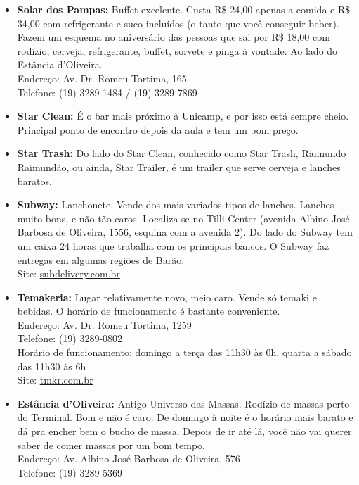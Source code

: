 \begin{itemize}
\item   \textbf{Solar dos Pampas:} Buffet excelente. Custa R\$ 24,00 apenas a
        comida e R\$ 34,00 com refrigerante e suco incluídos (o tanto que você
        conseguir beber). Fazem um esquema no aniversário das pessoas que sai
        por R\$ 18,00 com rodízio, cerveja, refrigerante, buffet, sorvete e
        pinga à vontade. Ao lado do Estância d'Oliveira.
        \\Endereço: Av. Dr. Romeu Tortima, 165
        \\Telefone: (19) 3289-1484 / (19) 3289-7869

\item   \textbf{Star Clean:} É o bar mais próximo à Unicamp, e por isso está
        sempre cheio. Principal ponto de encontro depois da aula e tem um bom
        preço.

\item   \textbf{Star Trash:} Do lado do Star Clean, conhecido como Star Trash,
        Raimundo Raimundão, ou ainda, Star Trailer, é um trailer que serve
        cerveja e lanches baratos.

\item   \textbf{Subway:} Lanchonete. Vende dos mais variados tipos de lanches.
        Lanches muito bons, e não tão caros. Localiza-se no Tilli Center
        (avenida Albino José Barbosa de Oliveira, 1556, esquina com a avenida
        2). Do lado do Subway tem um caixa 24 horas que trabalha com os
        principais bancos. O Subway faz entregas em algumas regiões de Barão.
        \\Site: \url{subdelivery.com.br}

\item   \textbf{Temakeria:} Lugar relativamente novo, meio caro. Vende só temaki
        e bebidas. O horário de funcionamento é bastante conveniente.
        \\Endereço: Av. Dr. Romeu Tortima, 1259
        \\Telefone: (19) 3289-0802
        \\Horário de funcionamento: domingo a terça das 11h30 às 0h, quarta a
        sábado das 11h30 às 6h
        \\Site: \url{tmkr.com.br}

\item   \textbf{Estância d'Oliveira:} Antigo Universo das Massas. Rodízio de
        massas perto do Terminal. Bom e não é caro. De domingo à noite é o
        horário mais barato e dá pra encher bem o bucho de massa. Depois de ir
        até lá, você não vai querer saber de comer massas por um bom tempo.
        \\Endereço: Av. Albino José Barbosa de Oliveira, 576
        \\Telefone: (19) 3289-5369


\end{itemize}
